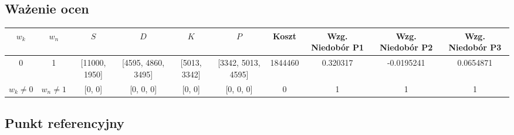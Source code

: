 \documentclass[a4paper, 10pt]{article}
\begin{document}
\newpage

\begin{landscape}
\subsection{Ważenie ocen}


\begin{center}
    \begin{tabular}{ | c | c | c | c | c | c | c | c | c | c |}
    \hline
    $w_k$ & $w_n$ & $S$ & $D$ & $K$ & $P$ & Koszt & Wzg. Niedobór P1  & Wzg. Niedobór P2 & Wzg. Niedobór P3 \\ \hline
	0 & 1 &  [11000, 1950] &  [4595, 4860, 3495] &  [5013, 3342] &  [3342, 5013, 4595] & 1844460 & 0.320317 & -0.0195241 & 0.0654871\\ \hline
	$w_k \ne 0$ & $w_n \ne 1$ &  [0, 0] &  [0, 0, 0] &  [0, 0] &  [0, 0, 0] & 0 & 1 & 1 & 1 \\ \hline
    \end{tabular}
\end{center}






\subsection{Punkt referencyjny}



\begin{center}
    \begin{tabular}{ | l | c | c | c | c | c | c | c | c |c |}
    \hline
	

\end{tabular}
\end{center}
\end{landscape}
\end{document}
